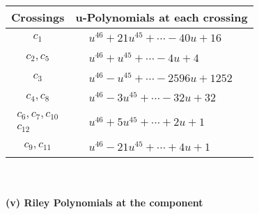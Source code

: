 \documentclass[1p]{elsarticle_modified}
\theoremstyle{definition}
\begin{document}
\begin{tabular}{m{50pt}|m{274pt}}
Crossings & \hspace{64pt}u-Polynomials at each crossing \\
\hline $$\begin{aligned}c_{1}\end{aligned}$$&$\begin{aligned}
&u^{46}+21 u^{45}+\cdots-40 u+16
\end{aligned}$\\
\hline $$\begin{aligned}c_{2},c_{5}\end{aligned}$$&$\begin{aligned}
&u^{46}+u^{45}+\cdots-4 u+4
\end{aligned}$\\
\hline $$\begin{aligned}c_{3}\end{aligned}$$&$\begin{aligned}
&u^{46}- u^{45}+\cdots-2596 u+1252
\end{aligned}$\\
\hline $$\begin{aligned}c_{4},c_{8}\end{aligned}$$&$\begin{aligned}
&u^{46}-3 u^{45}+\cdots-32 u+32
\end{aligned}$\\
\hline $$\begin{aligned}c_{6},c_{7},c_{10}\\c_{12}\end{aligned}$$&$\begin{aligned}
&u^{46}+5 u^{45}+\cdots+2 u+1
\end{aligned}$\\
\hline $$\begin{aligned}c_{9},c_{11}\end{aligned}$$&$\begin{aligned}
&u^{46}-21 u^{45}+\cdots+4 u+1
\end{aligned}$\\
\hline
\end{tabular}\\~\\
\newpage\renewcommand{\arraystretch}{1}
\flushleft \textbf{(v) Riley Polynomials at the component}\newline \\
\end{document}

